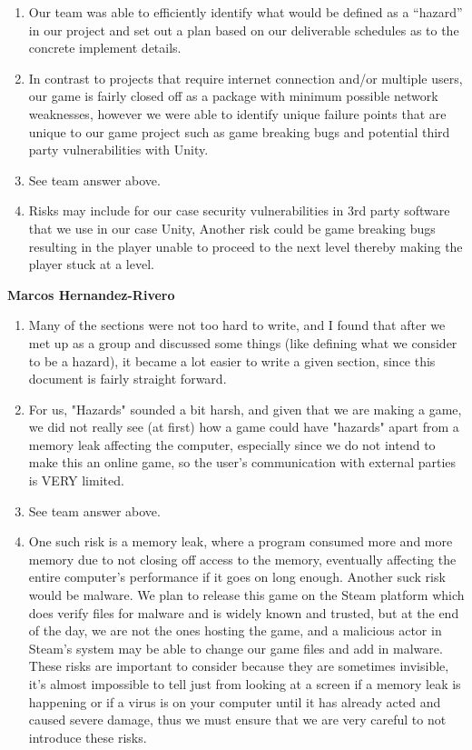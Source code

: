 \documentclass{article}
\begin{document}
\begin{enumerate}
\item{Our team was able to efficiently identify what would be defined as a “hazard” in our project and set out a plan based on our deliverable schedules as to the concrete implement details.}
\item{In contrast to projects that require internet connection and/or multiple users, our game is fairly closed off as a package with minimum possible network weaknesses, however we were able to identify unique failure points that are unique to our game project such as game breaking bugs and potential third party vulnerabilities with Unity.}
\item{See team answer above.}
\item{Risks may include for our case security vulnerabilities in 3rd party software that we use in our case Unity, Another risk could be game breaking bugs resulting in the player unable to proceed to the next level thereby making the player stuck at a level.}
\end{enumerate}
\textbf{Marcos Hernandez-Rivero}
\begin{enumerate}
\item{Many of the sections were not too hard to write, and I found that after we met up as a group and discussed some things (like defining what we consider to be a hazard), it became a lot easier to write a given section, since this document is fairly straight forward.}
\item{For us, "Hazards" sounded a bit harsh, and given that we are making a game, we did not really see (at first) how a game could have "hazards" apart from a memory leak affecting the computer, especially since we do not intend to make this an online game, so the user's communication with external parties is VERY limited.}
\item{See team answer above.}
\item{One such risk is a memory leak, where a program consumed more and more memory due to not closing off access to the memory, eventually affecting the entire computer's performance if it goes on long enough. Another suck risk would be malware. We plan to release this game on the Steam platform which does verify files for malware and is widely known and trusted, but at the end of the day, we are not the ones hosting the game, and a malicious actor in Steam's system may be able to change our game files and add in malware. These risks are important to consider because they are sometimes invisible, it's almost impossible to tell just from looking at a screen if a memory leak is happening or if a virus is on your computer until it has already acted and caused severe damage, thus we must ensure that we are very careful to not introduce these risks.}
\end{enumerate}
\end{document}
